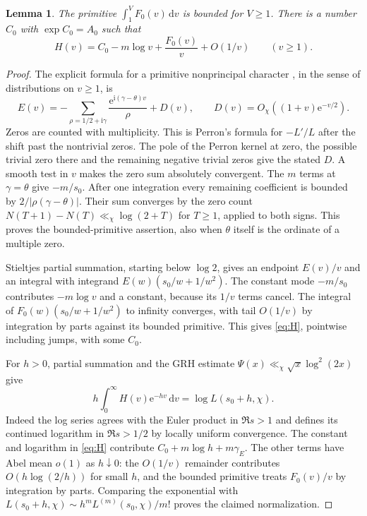 \documentclass[11pt]{article}
\newtheorem{lemma}[theorem]{Lemma}
\newcommand{\dd}{\,\mathrm d}
\newcommand{\e}{\mathrm e}
\newcommand{\ii}{\mathrm i}
\begin{document}
\begin{lemma}\label{lem:primitive}
The primitive $\int_1^V F_0(v)\dd v$ is bounded for $V\ge1$. There is a number $C_0$ with $\exp C_0=A_0$ such that
\begin{equation}\label{eq:H}
 H(v)=C_0-m\log v+\frac{F_0(v)}v+O(1/v)\qquad(v\ge1).
\end{equation}
\end{lemma}
\begin{proof}
The explicit formula for a primitive nonprincipal character \cite{dav,kouk}, in the sense of distributions on $v\ge1$, is
\begin{equation}\label{eq:explicit}
 E(v)=-\sum_{\rho=1/2+\ii\gamma}
            \frac{\e^{\ii(\gamma-\theta)v}}{\rho}+D(v),
 \qquad D(v)=O_\chi((1+v)\e^{-v/2}).
\end{equation}
Zeros are counted with multiplicity. This is Perron's formula for $-L'/L$ after the shift past the nontrivial zeros. The pole of the Perron kernel at zero, the possible trivial zero there and the remaining negative trivial zeros give the stated $D$. A smooth test in $v$ makes the zero sum absolutely convergent. The $m$ terms at $\gamma=\theta$ give $-m/s_0$. After one integration every remaining coefficient is bounded by $2/|\rho(\gamma-\theta)|$. Their sum converges by the zero count $N(T+1)-N(T)\ll_\chi\log(2+T)$ for $T\ge1$, applied to both signs. This proves the bounded-primitive assertion, also when $\theta$ itself is the ordinate of a multiple zero.

Stieltjes partial summation, starting below $\log 2$, gives an endpoint $E(v)/v$ and an integral with integrand $E(w)(s_0/w+1/w^2)$. The constant mode $-m/s_0$ contributes $-m\log v$ and a constant, because its $1/v$ terms cancel. The integral of $F_0(w)(s_0/w+1/w^2)$ to infinity converges, with tail $O(1/v)$ by integration by parts against its bounded primitive. This gives \eqref{eq:H}, pointwise including jumps, with some $C_0$.

For $h>0$, partial summation and the GRH estimate $\Psi(x)\ll_\chi\sqrt x\log^2(2x)$ give
\[
 h\int_0^\infty H(v)\e^{-hv}\dd v=\log L(s_0+h,\chi).
\]
Indeed the log series agrees with the Euler product in $\Re s>1$ and defines its continued logarithm in $\Re s>1/2$ by locally uniform convergence. The constant and logarithm in \eqref{eq:H} contribute $C_0+m\log h+m\gamma_E$. The other terms have Abel mean $o(1)$ as $h\downarrow0$: the $O(1/v)$ remainder contributes $O(h\log(2/h))$ for small $h$, and the bounded primitive treats $F_0(v)/v$ by integration by parts. Comparing the exponential with $L(s_0+h,\chi)\sim h^m L^{(m)}(s_0,\chi)/m!$ proves the claimed normalization.
\end{proof}
\end{document}
